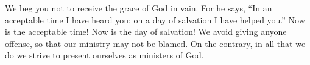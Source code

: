 \lettrine[lines=3]{W}{}e beg you not to receive the grace of God in vain. For he says, “In an acceptable time I have heard you; on a day of salvation I have helped you.” Now is the acceptable time! Now is the day of salvation! We avoid giving anyone offense, so that our ministry may not be blamed. On the contrary, in all that we do we strive to present ourselves as ministers of God.